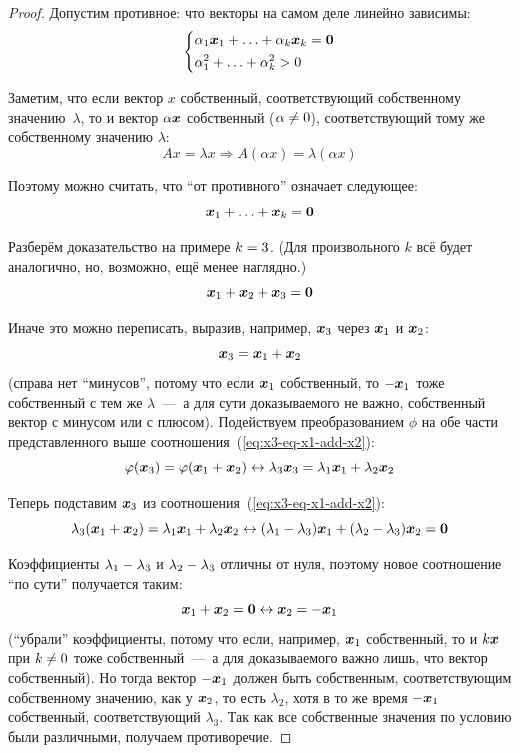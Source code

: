 \documentclass[a4paper,12pt]{article}
\begin{document}
  \begin{proof}
    Допустим противное: что векторы на самом деле линейно зависимы:
    \[
      \left\{
        \begin{aligned}
          &\alpha_1 \boldsymbol x_1 + \ldots + \alpha_k \boldsymbol x_k = \boldsymbol 0\\
          &\alpha_1^2 + \ldots + \alpha_k^2 > 0
        \end{aligned}
      \right.
    \]
    
    Заметим, что если вектор $x$ собственный, соответствующий собственному значению~$\lambda$, то и вектор $\alpha \boldsymbol x$ собственный ($\alpha \hm{\not=} 0$), соответствующий тому же собственному значению $\lambda$:
    \[
      Ax = \lambda x \Rightarrow A (\alpha x) = \lambda (\alpha x)
    \]
    
    Поэтому можно считать, что ``от противного'' означает следующее:
    \[
      \boldsymbol x_1 + \ldots + \boldsymbol x_k = \boldsymbol 0
    \]
    
    Разберём доказательство на примере $k \hm= 3$.
    (Для произвольного $k$ всё будет аналогично, но, возможно, ещё менее наглядно.)
    \[
      \boldsymbol x_1 + \boldsymbol x_2 + \boldsymbol x_3 = \boldsymbol 0
    \]
    
    Иначе это можно переписать, выразив, например, $\boldsymbol x_3$ через $\boldsymbol x_1$ и $\boldsymbol x_2$:
    \begin{equation}\label{eq:x3-eq-x1-add-x2}
      \boldsymbol x_3 = \boldsymbol x_1 + \boldsymbol x_2
    \end{equation}
    (справа нет ``минусов'', потому что если $\boldsymbol x_1$ собственный, то $-{\boldsymbol x_1}$ тоже собственный с тем же $\lambda$~---~а для сути доказываемого не важно, собственный вектор с минусом или с плюсом).
    Подействуем преобразованием $\phi$ на обе части представленного выше соотношения~(\ref{eq:x3-eq-x1-add-x2}):
    \[
      \varphi(\boldsymbol x_3) = \varphi(\boldsymbol x_1 + \boldsymbol x_2) \leftrightarrow \lambda_3 \boldsymbol x_3 = \lambda_1 \boldsymbol x_1 + \lambda_2 \boldsymbol x_2
    \]
    
    Теперь подставим $\boldsymbol x_3$ из соотношения~(\ref{eq:x3-eq-x1-add-x2}):
    \[
      \lambda_3 (\boldsymbol x_1 + \boldsymbol x_2) = \lambda_1 \boldsymbol x_1 + \lambda_2 \boldsymbol x_2
      \leftrightarrow (\lambda_1 - \lambda_3) \boldsymbol x_1 + (\lambda_2 - \lambda_3) \boldsymbol x_2 = \boldsymbol 0
    \]
    
    Коэффициенты $\lambda_1 \hm- \lambda_3$ и $\lambda_2 \hm- \lambda_3$ отличны от нуля, поэтому новое соотношение ``по сути'' получается таким:
    \[
      \boldsymbol x_1 + \boldsymbol x_2 = \boldsymbol 0 \leftrightarrow \boldsymbol x_2 = -{\boldsymbol x_1}
    \]
    (``убрали'' коэффициенты, потому что если, например, $\boldsymbol x_1$ собственный, то и  $k \boldsymbol x$ при $k \hm{\not=} 0$ тоже собственный~---~а для доказываемого важно лишь, что вектор собственный).
    Но тогда вектор $-{\boldsymbol x_1}$ должен быть собственным, соответствующим собственному значению, как у $\boldsymbol x_2$, то есть $\lambda_2$, хотя в то же время $-{\boldsymbol x_1}$ собственный, соответствующий $\lambda_3$.
    Так как все собственные значения по условию были различными, получаем противоречие.
    

\end{proof}
\end{document}
